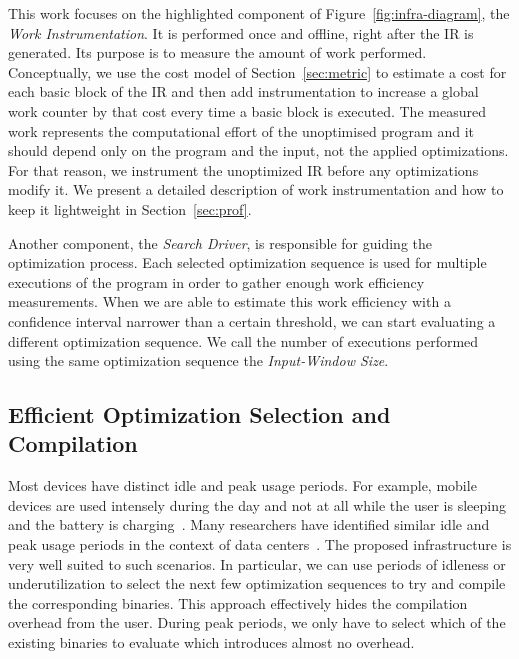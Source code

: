 This work focuses on the highlighted component of Figure~\ref{fig:infra-diagram}, the \textit{Work Instrumentation}. It is performed once
and offline, right after the IR is generated. Its purpose is to measure the amount of work performed. Conceptually, we use the cost model of
Section~\ref{sec:metric} to estimate a cost for each basic block of the IR and then add instrumentation to increase a global work counter
by that cost every time a basic block is executed. The measured work represents the computational effort of the unoptimised program and it
should depend only on the program and the input, not the applied optimizations. For that reason, we instrument the unoptimized IR before any optimizations modify it. We present a detailed description of work
instrumentation and how to keep it lightweight in Section~\ref{sec:prof}.

Another component, the \textit{Search Driver}, is responsible for guiding the optimization process. Each selected optimization sequence
is used for multiple executions of the program in order to gather enough work efficiency measurements. When we are able to
estimate this work efficiency with a confidence interval narrower than a certain threshold, we can start evaluating a different
optimization sequence. We call the number of executions performed using the same optimization sequence the \textit{Input-Window Size}.

\subsection{Efficient Optimization Selection and Compilation}

Most devices have distinct idle and peak usage periods. For example, mobile devices are used intensely during the day and not at all while
the user is sleeping and the battery is charging~\citep{mpeis16}. Many researchers have identified similar idle and peak usage periods in
the context of data centers~\citep{armbrust10,chen12b}. The proposed \itercomp infrastructure is very well suited to such scenarios. In
particular, we can use periods of idleness or underutilization to select the next few optimization sequences to try and compile the
corresponding binaries. This approach effectively hides the compilation overhead from the user. During peak periods, we only have to select
which of the existing binaries to evaluate which introduces almost no overhead.
